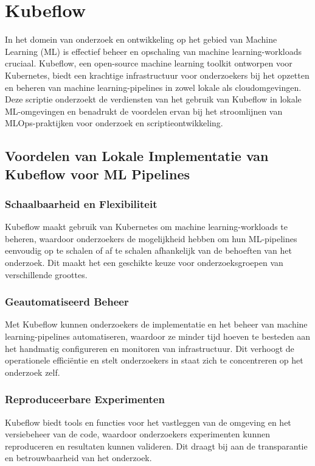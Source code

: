 \section{Kubeflow}

In het domein van onderzoek en ontwikkeling op het gebied van Machine Learning (ML) is effectief beheer en opschaling van machine learning-workloads cruciaal. Kubeflow, een open-source machine learning toolkit ontworpen voor Kubernetes, biedt een krachtige infrastructuur voor onderzoekers bij het opzetten en beheren van machine learning-pipelines in zowel lokale als cloudomgevingen. Deze scriptie onderzoekt de verdiensten van het gebruik van Kubeflow in lokale ML-omgevingen en benadrukt de voordelen ervan bij het stroomlijnen van MLOps-praktijken voor onderzoek en scriptieontwikkeling.

\subsection{Voordelen van Lokale Implementatie van Kubeflow voor ML Pipelines}

\subsubsection{Schaalbaarheid en Flexibiliteit}
Kubeflow maakt gebruik van Kubernetes om machine learning-workloads te beheren, waardoor onderzoekers de mogelijkheid hebben om hun ML-pipelines eenvoudig op te schalen of af te schalen afhankelijk van de behoeften van het onderzoek. Dit maakt het een geschikte keuze voor onderzoeksgroepen van verschillende groottes.

\subsubsection{Geautomatiseerd Beheer}
Met Kubeflow kunnen onderzoekers de implementatie en het beheer van machine learning-pipelines automatiseren, waardoor ze minder tijd hoeven te besteden aan het handmatig configureren en monitoren van infrastructuur. Dit verhoogt de operationele efficiëntie en stelt onderzoekers in staat zich te concentreren op het onderzoek zelf.

\subsubsection{Reproduceerbare Experimenten}
Kubeflow biedt tools en functies voor het vastleggen van de omgeving en het versiebeheer van de code, waardoor onderzoekers experimenten kunnen reproduceren en resultaten kunnen valideren. Dit draagt bij aan de transparantie en betrouwbaarheid van het onderzoek.

